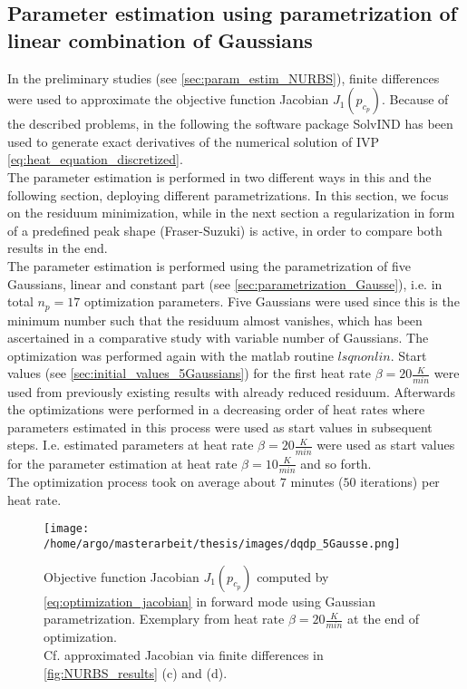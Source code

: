 \documentclass{scrartcl}[12pt, halfparskip]
\numberwithin{equation}{section}
\numberwithin{figure}{section}
\numberwithin{table}{section}
\begin{document}
\subsection{Parameter estimation using parametrization of linear combination of Gaussians}
\label{sec:param_estimation_5Gausse}
In the preliminary studies (see \cref{sec:param_estim_NURBS}), finite differences were used to approximate the objective function Jacobian $J_1(p_{c_p})$. 
Because of the described problems, in the following the software package SolvIND has been used to generate exact derivatives of the numerical solution of IVP \cref{eq:heat_equation_discretized}. \\
The parameter estimation is performed in two different ways in this and the following section, deploying different parametrizations. In this section, we focus on the residuum minimization, while in the next section a regularization in form of a predefined peak shape (Fraser-Suzuki) is active, in order to compare both results in the end. \\
The parameter estimation is performed using the parametrization of five Gaussians, linear and constant part (see \cref{sec:parametrization_Gausse}), i.e. in total $n_p=17$ optimization parameters. 
Five Gaussians were used since this is the minimum number such that the residuum almost vanishes, which has been ascertained in a comparative study with variable number of Gaussians. 
The optimization was performed again with the matlab routine $lsqnonlin$. Start values (see \cref{sec:initial_values_5Gaussians}) for the first heat rate $\beta = 20 \frac{K}{min}$ were used from previously existing results with already reduced residuum. 
Afterwards the optimizations were performed in a decreasing order of heat rates where parameters estimated in this process were used as start values in subsequent steps. 
I.e. estimated parameters at heat rate $\beta=20 \frac{K}{min}$ were used as start values for the parameter estimation at heat rate $\beta=10 \frac{K}{min}$ and so forth. \\
The optimization process took on average about $7$ minutes ($50$ iterations) per heat rate.


\begin{figure}[H]
	\centering
	\texttt{[image: /home/argo/masterarbeit/thesis/images/dqdp\_5Gausse.png]}
	\caption{Objective function Jacobian $J_1(p_{c_p})$ computed by \cref{eq:optimization_jacobian} in forward mode using Gaussian parametrization. Exemplary from heat rate $\beta=20 \frac{K}{min}$ at the end of optimization. \\
	Cf. approximated Jacobian via finite differences in \cref{fig:NURBS_results} (c) and (d).}
	\label{fig:dqdp_5Gausse}
\end{figure}
\end{document}
